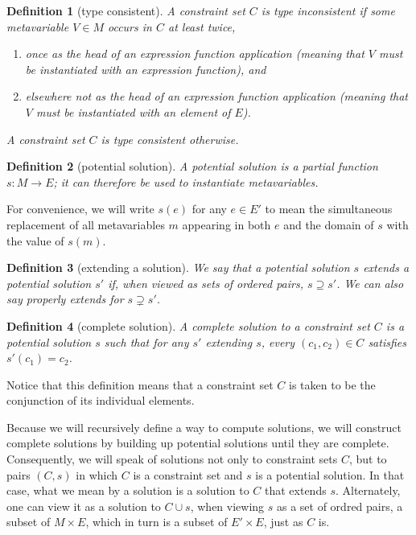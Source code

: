 \documentclass{article}
\newtheorem{dfn}{Definition}
\begin{document}
\begin{dfn}[type consistent]\label{D:consistent}
A constraint set $C$ is \emph{type inconsistent} if some metavariable $V\in M$ occurs in $C$ at least twice,
\begin{enumerate}
\item	once as the head of an expression function application (meaning that $V$ must be instantiated with an expression function), and
\item	elsewhere \emph{not} as the head of an expression function application (meaning that $V$ must be instantiated with an element of $E$).
\end{enumerate}
A constraint set $C$ is \emph{type consistent} otherwise.
\end{dfn}

\begin{dfn}[potential solution]
A \emph{potential solution} is a partial function $s:M\to E$; it can therefore be used to instantiate metavariables.
\end{dfn}

For convenience, we will write $s(e)$ for any $e\in E'$ to mean the simultaneous replacement of all metavariables $m$ appearing in both $e$ and the domain of $s$ with the value of $s(m)$.

\begin{dfn}[extending a solution]
We say that a potential solution $s$ \emph{extends} a potential solution $s'$ if, when viewed as sets of ordered pairs, $s\supseteq s'$.  We can also say \emph{properly extends} for $s\supsetneq s'$.
\end{dfn}

\begin{dfn}[complete solution]\label{D:sol}
A \emph{complete solution} to a constraint set $C$ is a potential solution $s$ such that for any $s'$ extending $s$, every $(c_1,c_2)\in C$ satisfies $s'(c_1)=c_2$.
\end{dfn}

Notice that this definition means that a constraint set $C$ is taken to be the conjunction of its individual elements.

Because we will recursively define a way to compute solutions, we will construct complete solutions by building up potential solutions until they are complete.  Consequently, we will speak of solutions not only to constraint sets $C$, but to pairs $(C,s)$ in which $C$ is a constraint set and $s$ is a potential solution.  In that case, what we mean by a solution is a solution to $C$ that extends $s$.  Alternately, one can view it as a solution to $C\cup s$, when viewing $s$ as a set of ordred pairs, a subset of $M\times E$, which in turn is a subset of $E'\times E$, just as $C$ is.
\end{document}
